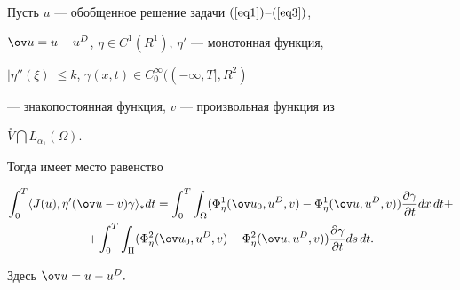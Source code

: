 \begin{lem} \label{L3}


Пусть $u$ --- обобщенное решение задачи $(\ref{eq1})$--$(\ref{eq3})$,


$\ov u=u-u^{D}$, $\eta\in C^{1}(R^{1})$, $\eta '$ --- монотонная функция,


$| \eta'' (\xi) | \leq k$, $\gamma(x,t)\in C_{0}^{\infty}((-\infty,T],R^2)$


--- знакопостоянная функция, $v$ --- произвольная функция из


$\overset{\circ}{V} \bigcap L_{\alpha_{1}}(\Omega)$.


Тогда имеет место равенство


\begin{multline}


\label{eq14} 


\int_{0}^{T} \langle J(u), {\eta}' (\ov u -v) \gamma \rangle_{*} dt=


\int_{0}^{T} \int_{\Omega} (\Phi_{\eta}^{1} (\ov u_{0}, u^{D}, v) -


\Phi_{\eta}^{1}(\ov u, u^{D}, v))\frac{\partial\gamma}{\partial t}dx\,dt+ \\


%


+\int_{0}^{T} \int_{\Pi} (\Phi_{\eta}^{2} (\ov u_{0}, u^{D}, v) -


\Phi_{\eta}^{2}(\ov u,u^{D},v))\frac{\partial\gamma}{\partial t}ds\,dt.


\end{multline}


Здесь $ \ov u=u-u^{D}. $ 


\end{lem}





